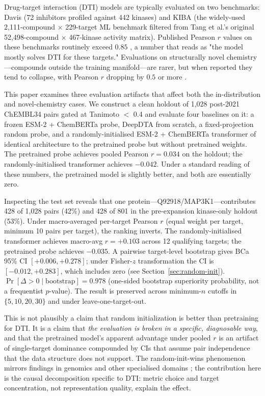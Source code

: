 \documentclass[11pt,a4paper]{article}
\begin{document}
Drug-target interaction (DTI) models are typically evaluated on two benchmarks:
Davis \citep{davis2011comprehensive} (72 inhibitors profiled against 442 kinases) and
KIBA \citep{tang2014making} (the widely-used 2{,}111-compound $\times$ 229-target
ML benchmark filtered from Tang et al.'s original 52{,}498-compound $\times$
467-kinase activity matrix).
Published Pearson $r$ values on these benchmarks routinely exceed $0.85$
\citep{ozturk2018deepdta,nguyen2021graphdta,huang2021moltrans,ross2022large}, a
number that reads as "the model mostly solves DTI for these targets."
Evaluations on structurally novel chemistry---compounds outside the training
manifold---are rarer, but when reported they tend to collapse, with Pearson $r$
dropping by $0.5$ or more \citep{wallach2018most,bender2022evaluation}.

This paper examines three evaluation artifacts that affect both the
in-distribution and novel-chemistry cases.
We construct a clean holdout of 1{,}028 post-2021 ChEMBL34 pairs gated at
Tanimoto $<$ 0.4 and evaluate four baselines on it: a frozen ESM-2 + ChemBERTa
probe, DeepDTA from scratch, a fixed-projection random probe, and a
randomly-initialised ESM-2 + ChemBERTa transformer of identical architecture to
the pretrained probe but without pretrained weights.
The pretrained probe achieves pooled Pearson $r = 0.034$ on the holdout; the
randomly-initialised transformer achieves $-0.042$.
Under a standard reading of these numbers, the pretrained model is slightly
better, and both are essentially zero.

Inspecting the test set reveals that one protein---Q92918/MAP3K1---contributes
428 of 1{,}028 pairs (42\%) and 428 of 801 in the pre-expansion kinase-only
holdout (53\%). Under macro-averaged per-target Pearson $r$ (equal weight per
target, minimum 10 pairs per target), the ranking inverts.
The randomly-initialised transformer achieves macro-avg $r = +0.103$ across 12
qualifying targets; the pretrained probe achieves $-0.035$.
A pairwise target-level bootstrap gives BCa 95\% CI $[+0.006, +0.278]$;
under Fisher-$z$ transformation the CI is $[-0.012, +0.283]$, which includes
zero (see Section~\ref{sec:random-init}).
$\Pr[\Delta > 0 \mid \text{bootstrap}] = 0.978$ (one-sided bootstrap superiority
probability, not a frequentist $p$-value).
The result is preserved across minimum-$n$ cutoffs in $\{5, 10, 20, 30\}$ and
under leave-one-target-out.

This is not plausibly a claim that random initialization is better than
pretraining for DTI.
It is a claim that \emph{the evaluation is broken in a specific, diagnosable way},
and that the pretrained model's apparent advantage under pooled $r$ is an
artifact of single-target dominance compounded by CIs that assume pair
independence that the data structure does not support.
The random-init-wins phenomenon mirrors findings in genomics
\citep{vishniakov2024genomic} and other specialised domains
\citep{xu2025specialized}; the contribution here is the causal decomposition
specific to DTI: metric choice and target concentration, not representation
quality, explain the effect.
\end{document}
